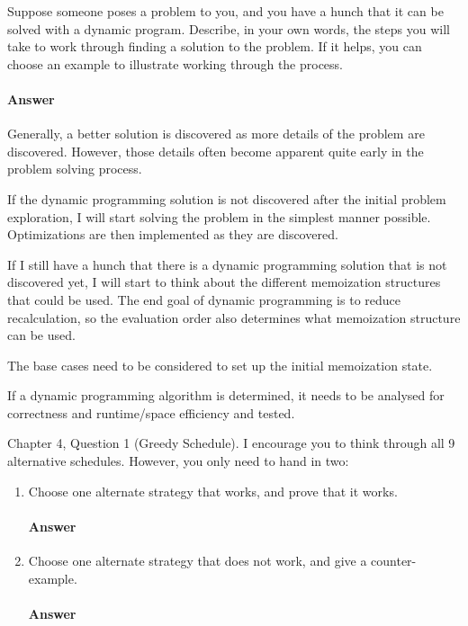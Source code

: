 \documentclass{article}
\begin{document}

Suppose someone poses a problem to you, and you have a hunch that it can be
solved with a dynamic program.  Describe, in your own words, the steps you will
take to work through finding a solution to the problem.  If it helps, you can
choose an example to illustrate working through the process.

\paragraph{Answer}

Generally, a better solution is discovered as more details of the problem are discovered. However, those details often become apparent quite early in the problem solving process.

If the dynamic programming solution is not discovered after the initial problem exploration, I will start solving the problem in the simplest manner possible. Optimizations are then implemented as they are discovered.

If I still have a hunch that there is a dynamic programming solution that is not discovered yet, I will start to think about the different memoization structures that could be used. The end goal of dynamic programming is to reduce recalculation, so the evaluation order also determines what memoization structure can be used.

The base cases need to be considered to set up the initial memoization state.

If a dynamic programming algorithm is determined, it needs to be analysed for correctness and runtime/space efficiency and tested.


Chapter 4, Question 1 (Greedy Schedule).  I encourage you to think through all 9
alternative schedules.  However, you only need to hand in two:
\begin{enumerate}
    \item Choose one alternate strategy that
        works, and prove that it works.

    \paragraph{Answer}
    \todo{}

    \item Choose one alternate strategy that does not work, and give a
        counter-example.

    \paragraph{Answer}
    \todo{}

\end{enumerate}
\end{document}
